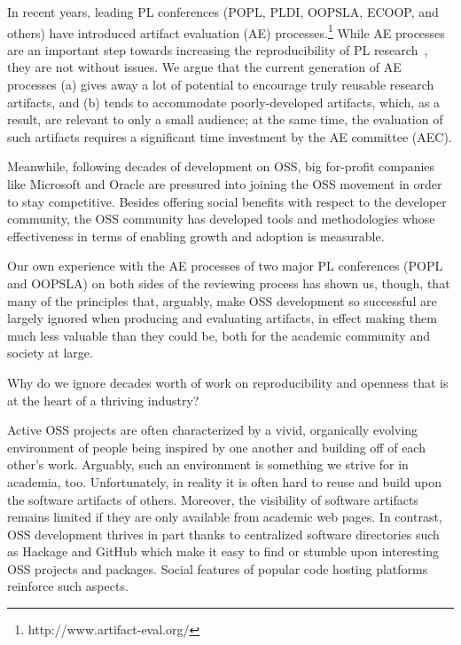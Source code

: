 \documentclass{sigplanconf}
\begin{document}
In recent years, leading PL conferences (POPL, PLDI, OOPSLA, ECOOP, and
others) have introduced artifact evaluation (AE)
processes.\footnote{http://www.artifact-eval.org/} While AE processes are an
important step towards increasing the reproducibility of PL
research~\cite{Vitek14}, they are not without issues. We argue that the
current generation of AE processes (a) gives away a lot of potential to
encourage truly reusable research artifacts, and (b) tends to accommodate
poorly-developed artifacts, which, as a result, are relevant to only a small
audience; at the same time, the evaluation of such artifacts requires a
significant time investment by the AE committee (AEC).

Meanwhile, following decades of development on OSS, big for-profit companies
like Microsoft and Oracle are pressured into joining the OSS movement in order
to stay competitive. Besides offering social benefits with respect to the
developer community, the OSS community has developed tools and methodologies
whose effectiveness in terms of enabling growth and adoption is measurable.

Our own experience with the AE processes of two major PL conferences (POPL and
OOPSLA) on both sides of the reviewing process has shown us, though, that many
of the principles that, arguably, make OSS development so successful are
largely ignored when producing and evaluating artifacts, in effect making them
much less valuable than they could be, both for the academic community and
society at large.

Why do we ignore decades worth of work on reproducibility and openness that is
at the heart of a thriving industry?

Active OSS projects are often characterized by a vivid, organically evolving
environment of people being inspired by one another and building off of each
other's work. Arguably, such an environment is something we strive for in
academia, too. Unfortunately, in reality it is often hard to reuse and build
upon the software artifacts of others. Moreover, the visibility of software
artifacts remains limited if they are only available from academic web pages.
In contrast, OSS development thrives in part thanks to centralized software
directories such as Hackage and GitHub which make it easy to find or stumble
upon interesting OSS projects and packages. Social features of popular code
hosting platforms reinforce such aspects.
\end{document}
